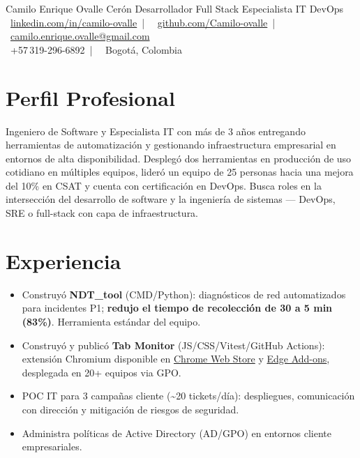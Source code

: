 \documentclass[10pt]{article}
\begin{document}
\cvheader
  {Camilo Enrique Ovalle Cerón}
  {Desarrollador Full Stack \textbar{} Especialista IT \textbar{} DevOps}
  {%
    \faLinkedin~\href{https://linkedin.com/in/camilo-ovalle}{linkedin.com/in/camilo-ovalle}~|~%
    \faGithub~\href{https://github.com/Camilo-ovalle}{github.com/Camilo-ovalle}~|~%
    \faEnvelope~\href{mailto:camilo.enrique.ovalle@gmail.com}{camilo.enrique.ovalle@gmail.com}\\[1pt]%
    \faPhone~+57\,319-296-6892~|~%
    \faMapMarker*~Bogotá, Colombia%
  }

\section{Perfil Profesional}

Ingeniero de Software y Especialista IT con más de 3 años entregando herramientas de
automatización y gestionando infraestructura empresarial en entornos de alta disponibilidad.
Desplegó dos herramientas en producción de uso cotidiano en múltiples equipos, lideró
un equipo de 25 personas hacia una mejora del 10\% en CSAT y cuenta con certificación
en DevOps. Busca roles en la intersección del desarrollo de software y la ingeniería de
sistemas — DevOps, SRE o full-stack con capa de infraestructura.

\section{Experiencia}

\begin{itemize}
  \item Construyó \textbf{NDT\_tool} (CMD/Python): diagnósticos de red automatizados para incidentes
        P1; \textbf{redujo el tiempo de recolección de 30 a 5 min (83\%)}. Herramienta estándar del equipo.
  \item Construyó y publicó \textbf{Tab Monitor} (JS/CSS/Vitest/GitHub Actions): extensión Chromium
        disponible en \href{https://chromewebstore.google.com/detail/tab-monitor/apbgiakfdalcpmnopopopookdceecnfj}{Chrome Web Store}
        y \href{https://microsoftedge.microsoft.com/addons/detail/tab-monitor/aidfbccdmjdoloknpoiacciagffokjcb}{Edge Add-ons},
        desplegada en 20+ equipos via GPO.
  \item POC IT para 3 campañas cliente (\textasciitilde20 tickets/día): despliegues, comunicación con
        dirección y mitigación de riesgos de seguridad.
  \item Administra políticas de Active Directory (AD/GPO) en entornos cliente empresariales.
\end{itemize}
\end{document}

